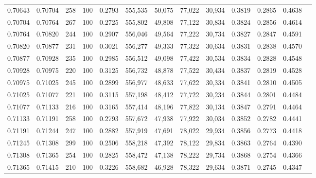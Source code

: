 \begin{tabular}{rrrrrrrrrrrrr}
0.70643 & 0.70704 &   258 & 100 &                                     0.2793 & 555,535 &  50,075 &  77,022 &  30,934 & 0.3819 & 0.2865 & 0.4638 \\
0.70704 & 0.70764 &   267 & 100 &                                     0.2725 & 555,802 &  49,808 &  77,122 &  30,834 & 0.3824 & 0.2856 & 0.4614 \\
0.70764 & 0.70820 &   244 & 100 &                                     0.2907 & 556,046 &  49,564 &  77,222 &  30,734 & 0.3827 & 0.2847 & 0.4591 \\
0.70820 & 0.70877 &   231 & 100 &                                     0.3021 & 556,277 &  49,333 &  77,322 &  30,634 & 0.3831 & 0.2838 & 0.4570 \\
0.70877 & 0.70928 &   235 & 100 &                                     0.2985 & 556,512 &  49,098 &  77,422 &  30,534 & 0.3834 & 0.2828 & 0.4548 \\
0.70928 & 0.70975 &   220 & 100 &                                     0.3125 & 556,732 &  48,878 &  77,522 &  30,434 & 0.3837 & 0.2819 & 0.4528 \\
0.70975 & 0.71025 &   245 & 100 &                                     0.2899 & 556,977 &  48,633 &  77,622 &  30,334 & 0.3841 & 0.2810 & 0.4505 \\
0.71025 & 0.71077 &   221 & 100 &                                     0.3115 & 557,198 &  48,412 &  77,722 &  30,234 & 0.3844 & 0.2801 & 0.4484 \\
0.71077 & 0.71133 &   216 & 100 &                                     0.3165 & 557,414 &  48,196 &  77,822 &  30,134 & 0.3847 & 0.2791 & 0.4464 \\
0.71133 & 0.71191 &   258 & 100 &                                     0.2793 & 557,672 &  47,938 &  77,922 &  30,034 & 0.3852 & 0.2782 & 0.4441 \\
0.71191 & 0.71244 &   247 & 100 &                                     0.2882 & 557,919 &  47,691 &  78,022 &  29,934 & 0.3856 & 0.2773 & 0.4418 \\
0.71245 & 0.71308 &   299 & 100 &                                     0.2506 & 558,218 &  47,392 &  78,122 &  29,834 & 0.3863 & 0.2764 & 0.4390 \\
0.71308 & 0.71365 &   254 & 100 &                                     0.2825 & 558,472 &  47,138 &  78,222 &  29,734 & 0.3868 & 0.2754 & 0.4366 \\
0.71365 & 0.71415 &   210 & 100 &                                     0.3226 & 558,682 &  46,928 &  78,322 &  29,634 & 0.3871 & 0.2745 & 0.4347 \\

\end{tabular}
